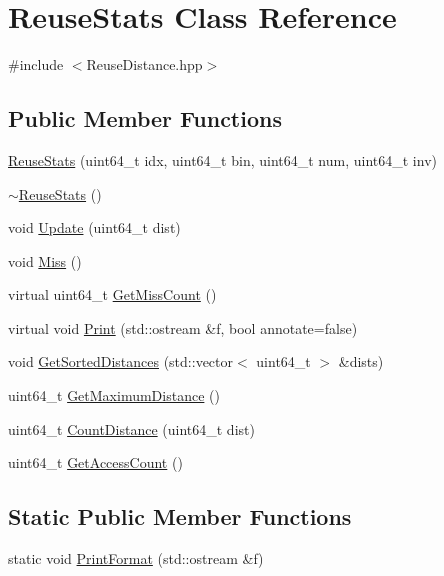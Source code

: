 \hypertarget{class_reuse_stats}{
\section{ReuseStats Class Reference}
\label{class_reuse_stats}
}


{\ttfamily \#include $<$ReuseDistance.hpp$>$}

\subsection*{Public Member Functions}
\begin{DoxyCompactItemize}
\item 
\hyperlink{class_reuse_stats_a8e2f08c38fb9d1df602c97832d796f3b}{ReuseStats} (uint64\_\-t idx, uint64\_\-t bin, uint64\_\-t num, uint64\_\-t inv)
\item 
\hyperlink{class_reuse_stats_a21f8a5cab3976edba08c2562c3ed8d45}{$\sim$ReuseStats} ()
\item 
void \hyperlink{class_reuse_stats_a5383136c63ed260d9aad44a8d048a2ed}{Update} (uint64\_\-t dist)
\item 
void \hyperlink{class_reuse_stats_a3d963a3b6c2c0b37b23d4e0723a70831}{Miss} ()
\item 
virtual uint64\_\-t \hyperlink{class_reuse_stats_aeff4f3fe0f2253e1aed432b18ec85d85}{GetMissCount} ()
\item 
virtual void \hyperlink{class_reuse_stats_a6df6fca111e9ba009af2e3a37824d854}{Print} (std::ostream \&f, bool annotate=false)
\item 
void \hyperlink{class_reuse_stats_adcb657e303c090ac5ef210f6c4506986}{GetSortedDistances} (std::vector$<$ uint64\_\-t $>$ \&dists)
\item 
uint64\_\-t \hyperlink{class_reuse_stats_ac70175a532ea2dc608e0fd2f04e4fcbb}{GetMaximumDistance} ()
\item 
uint64\_\-t \hyperlink{class_reuse_stats_abdb92b77ec7191be80e77a34f894e11b}{CountDistance} (uint64\_\-t dist)
\item 
uint64\_\-t \hyperlink{class_reuse_stats_a48935d131ce635b1b37b2a43f0c52217}{GetAccessCount} ()
\end{DoxyCompactItemize}
\subsection*{Static Public Member Functions}
\begin{DoxyCompactItemize}
\item 
static void \hyperlink{class_reuse_stats_aca96e50e202d9de9d35d5637ce542a3c}{PrintFormat} (std::ostream \&f)
\end{DoxyCompactItemize}


